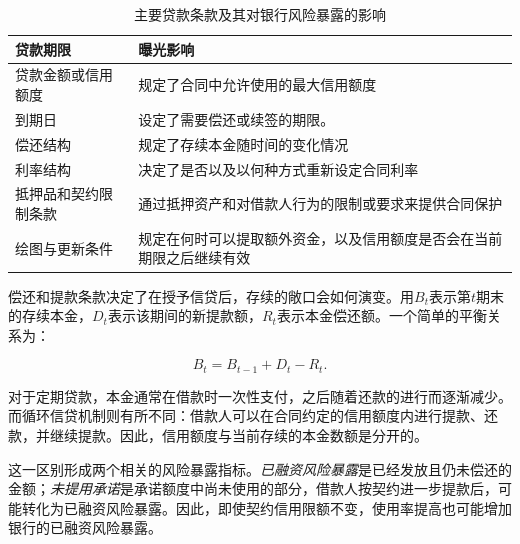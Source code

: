 \begin{table}[htbp]

\centering

\caption{主要贷款条款及其对银行风险暴露的影响}

\label{tab:ch12-loan-terms-exposure}

\begin{tabularx}{0.90\textwidth}{@{}p{} X@{}}

\toprule

\textbf{贷款期限} &
\textbf{曝光影响} \\

\midrule

贷款金额或信用额度 &
规定了合同中允许使用的最大信用额度 \\

到期日 &
设定了需要偿还或续签的期限。\\

偿还结构 &
规定了存续本金随时间的变化情况 \\

利率结构 &  
决定了是否以及以何种方式重新设定合同利率 \\

抵押品和契约限制条款 &
通过抵押资产和对借款人行为的限制或要求来提供合同保护 \\

绘图与更新条件 &  
规定在何时可以提取额外资金，以及信用额度是否会在当前期限之后继续有效 \\

\bottomrule

\end{tabularx}

\end{table}

偿还和提款条款决定了在授予信贷后，存续的敞口会如何演变。用$B_t$表示第$t$期末的存续本金，$D_t$表示该期间的新提款额，$R_t$表示本金偿还额。一个简单的平衡关系为：

\begin{equation}
B_t=B_{t-1}+D_t-R_t.
\label{eq:ch12-loan-balance-dynamics}
\end{equation}

对于定期贷款，本金通常在借款时一次性支付，之后随着还款的进行而逐渐减少。而循环信贷机制则有所不同：借款人可以在合同约定的信用额度内进行提款、还款，并继续提款。因此，信用额度与当前存续的本金数额是分开的。

这一区别形成两个相关的风险暴露指标。\emph{已融资风险暴露}是已经发放且仍未偿还的金额；\emph{未提用承诺}是承诺额度中尚未使用的部分，借款人按契约进一步提款后，可能转化为已融资风险暴露。因此，即使契约信用限额不变，使用率提高也可能增加银行的已融资风险暴露。

